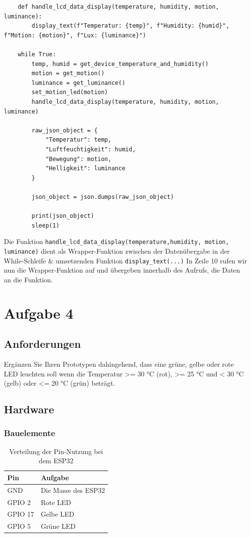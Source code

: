 \documentclass[9pt,a4paper]{report}
\begin{document}
	\begin{lstlisting}
	def handle_lcd_data_display(temperature, humidity, motion, luminance):
		display_text(f"Temperatur: {temp}", f"Humidity: {humid}", f"Motion: {motion}", f"Lux: {luminance}")
		
	while True:
		temp, humid = get_device_temperature_and_humidity()
		motion = get_motion()    
		luminance = get_luminance()
		set_motion_led(motion)
		handle_lcd_data_display(temperature, humidity, motion, luminance)
	
		raw_json_object = {
			"Temperatur": temp,
			"Luftfeuchtigkeit": humid,
			"Bewegung": motion,
			"Helligkeit": luminance
		}
	
		json_object = json.dumps(raw_json_object)
	
		print(json_object)
		sleep(1)
	\end{lstlisting}
	Die Funktion \texttt{handle\_lcd\_data\_display(temperature,humidity, motion, luminance)} dient als Wrapper-Funktion zwischen der Datenübergabe in der While-Schleife \& umsetzenden Funktion \texttt{display\_text(...)}
	\newline
	\newline
	In Zeile 10 rufen wir nun die Wrapper-Funktion auf und übergeben innerhalb des Aufrufs, die Daten an die Funktion.
	
	\chapter{Aufgabe 4}
	\section{Anforderungen}
	Ergänzen Sie Ihren Prototypen dahingehend, dass eine grüne, gelbe oder rote LED leuchten soll wenn die Temperatur >= 30 °C (rot), >= 25 °C und < 30 °C (gelb) oder <= 20 °C (grün) beträgt.
	
	\section{Hardware}
	\subsection{Bauelemente}
	\renewcommand{\arraystretch}{1.5}
	\begin{table}[h!]
		\centering
		\caption{Verteilung der Pin-Nutzung bei dem ESP32}
		\label{tab:teil_4_steckbrett_esp32}
		\begin{tabular}{|l|l|} 
			\hline
			Pin & Aufgabe \\
			\hline
			GND & Die Masse des ESP32 \\
			GPIO 2 & Rote LED \\
			GPIO 17 & Gelbe LED \\
			GPIO 5 & Grüne LED \\
			\hline
		\end{tabular}
	\end{table}
	\renewcommand{\arraystretch}{1}
\end{document}
